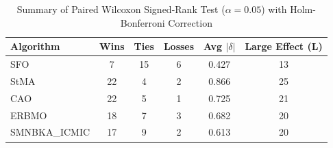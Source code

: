\begin{table}[!t]
\centering\small
\caption{Summary of Paired Wilcoxon Signed-Rank Test ($\alpha=0.05$) with Holm-Bonferroni Correction}
\label{tab:summary_stats}
\begin{tabular}{l|c|c|c|c|c}
\hline
Algorithm & Wins & Ties & Losses & Avg $|\delta|$ & Large Effect (L) \\\hline\hline
SFO & 7 & 15 & 6 & 0.427 & 13 \\\hline
StMA & 22 & 4 & 2 & 0.866 & 25 \\\hline
CAO & 22 & 5 & 1 & 0.725 & 21 \\\hline
ERBMO & 18 & 7 & 3 & 0.682 & 20 \\\hline
SMNBKA_ICMIC & 17 & 9 & 2 & 0.613 & 20 \\\hline
\end{tabular}
\end{table}
